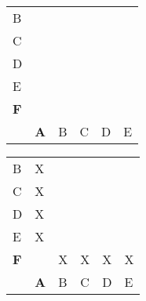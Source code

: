 \begin{figure}[t]

\begin{subfigure}[b]{.5\linewidth}
\centering
\begin{tabular}{llllll}
\cline{2-2}
\multicolumn{1}{l|}{B} & \multicolumn{1}{l|}{} &                       &                       &                       &                       \\ \cline{2-3}
\multicolumn{1}{l|}{C} & \multicolumn{1}{l|}{} & \multicolumn{1}{l|}{} &                       &                       &                       \\ \cline{2-4}
\multicolumn{1}{l|}{D} & \multicolumn{1}{l|}{} & \multicolumn{1}{l|}{} & \multicolumn{1}{l|}{} &                       &                       \\ \cline{2-5}
\multicolumn{1}{l|}{E} & \multicolumn{1}{l|}{} & \multicolumn{1}{l|}{} & \multicolumn{1}{l|}{} & \multicolumn{1}{l|}{} &                       \\ \cline{2-6}
\multicolumn{1}{l|}{\textbf{F}} & \multicolumn{1}{l|}{} & \multicolumn{1}{l|}{} & \multicolumn{1}{l|}{} & \multicolumn{1}{l|}{} & \multicolumn{1}{l|}{} \\ \cline{2-6}
                       & \textbf{A}                     & B                     & C                     & D                     & E
\end{tabular}
\caption{}
\label{min-tab-1}
\end{subfigure}
%
\begin{subfigure}[b]{.5\linewidth}
\centering
\begin{tabular}{llllll}
\cline{2-2}
\multicolumn{1}{l|}{B}          & \multicolumn{1}{l|}{X} &                        &                        &                        &                        \\ \cline{2-3}
\multicolumn{1}{l|}{C}          & \multicolumn{1}{l|}{X} & \multicolumn{1}{l|}{}  &                        &                        &                        \\ \cline{2-4}
\multicolumn{1}{l|}{D}          & \multicolumn{1}{l|}{X} & \multicolumn{1}{l|}{}  & \multicolumn{1}{l|}{}  &                        &                        \\ \cline{2-5}
\multicolumn{1}{l|}{E}          & \multicolumn{1}{l|}{X} & \multicolumn{1}{l|}{}  & \multicolumn{1}{l|}{}  & \multicolumn{1}{l|}{}  &                        \\ \cline{2-6}
\multicolumn{1}{l|}{\textbf{F}} & \multicolumn{1}{l|}{}  & \multicolumn{1}{l|}{X} & \multicolumn{1}{l|}{X} & \multicolumn{1}{l|}{X} & \multicolumn{1}{l|}{X} \\ \cline{2-6}
                                & \textbf{A}             & B                      & C                      & D                      & E
\end{tabular}
    \caption{}
    \label{min-tab-2}
\end{subfigure}

\caption{}
\end{figure}


